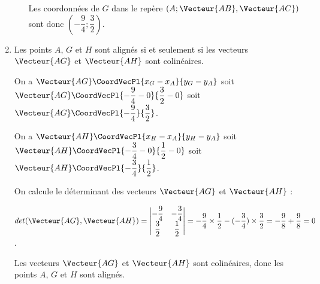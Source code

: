 \documentclass[a4paper]{article}
\begin{document}
\begin{exercice}{}{}
\begin{enumerate}
\begin{enumerate}
        Les coordonnées de $G$ dans le repère $(A ; \Vecteur{AB}, \Vecteur{AC})$ sont donc $(-\dfrac{9}{4} ; \dfrac{3}{2})$.

      \end{enumerate}
      \item Les points $A$, $G$ et $H$ sont alignés si et seulement si les vecteurs $\Vecteur{AG}$ et $\Vecteur{AH}$ sont colinéaires.
      
      On a $\Vecteur{AG}\CoordVecPl{x_G-x_A}{y_G-y_A}$ soit $\Vecteur{AG}\CoordVecPl{-\dfrac{9}{4}-0}{\dfrac{3}{2}-0}$ soit $\Vecteur{AG}\CoordVecPl{-\dfrac{9}{4}}{\dfrac{3}{2}}$.

      On a $\Vecteur{AH}\CoordVecPl{x_H-x_A}{y_H-y_A}$ soit $\Vecteur{AH}\CoordVecPl{-\dfrac{3}{4}-0}{\dfrac{1}{2}-0}$ soit $\Vecteur{AH}\CoordVecPl{-\dfrac{3}{4}}{\dfrac{1}{2}}$.

      On calcule le déterminant des vecteurs $\Vecteur{AG}$ et $\Vecteur{AH}$ :

      $det(\Vecteur{AG},\Vecteur{AH})=\begin{vmatrix}
        -\dfrac{9}{4} & -\dfrac{3}{4}\\
        \dfrac{3}{2} & \dfrac{1}{2}
      \end{vmatrix} = -\dfrac{9}{4} \times \dfrac{1}{2} - (-\dfrac{3}{4}) \times \dfrac{3}{2} = -\dfrac{9}{8} + \dfrac{9}{8} = 0$.

      Les vecteurs $\Vecteur{AG}$ et $\Vecteur{AH}$ sont colinéaires, donc les points $A$, $G$ et $H$ sont alignés.

    \end{enumerate}
  \end{exercice}
\end{document}
